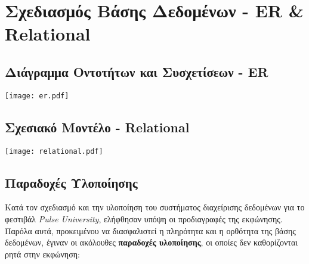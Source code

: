 \documentclass[13pt]{extarticle}
\begin{document}
\clearpage
\section{Σχεδιασμός Βάσης Δεδομένων - ER \& Relational}
\subsection{Διάγραμμα Οντοτήτων και Συσχετίσεων - ER}
\begin{center}
    \texttt{[image: er.pdf]}
\end{center}
\vspace{5cm}

\subsection{Σχεσιακό Μοντέλο - Relational}
\begin{center}
    \texttt{[image: relational.pdf]}
\end{center}
\vspace{5cm}

\subsection{Παραδοχές Υλοποίησης}

Κατά τον σχεδιασμό και την υλοποίηση του συστήματος διαχείρισης δεδομένων για το φεστιβάλ \textit{Pulse University}, ελήφθησαν υπόψη οι προδιαγραφές της εκφώνησης. Παρόλα αυτά, προκειμένου να διασφαλιστεί η πληρότητα και η ορθότητα της βάσης δεδομένων, έγιναν οι ακόλουθες \textbf{παραδοχές υλοποίησης}, οι οποίες δεν καθορίζονται ρητά στην εκφώνηση:
\end{document}
